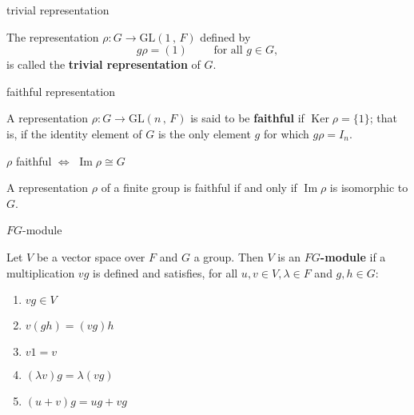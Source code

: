 \documentclass[avery5371,grid]{flashcards}
\newcommand{\iso}{\cong}
\newcommand{\GLnF}[2]{\ensuremath{\textrm{GL} \left( #1 \, , \, #2 \right)}}
\DeclareMathOperator{\Ker}{\ensuremath{\textrm{Ker}}}
\DeclareMathOperator{\Img}{\ensuremath{\textrm{Im}}}
\newcommand{\defn}[1]{\textbf{#1}}
\begin{document}
\begin{flashcard}[Definition 3.5]{trivial representation}

  The representation $\rho: G \to \GLnF{1}{F}$ defined by
  \[
    g \rho = (1)\qquad \text{ for all } g \in G,
  \]
  is called the \defn{trivial representation} of $G$.

\end{flashcard}

\begin{flashcard}[Definition3.6]{faithful representation}

  A representation $\rho : G \to \GLnF{n}{F}$ is said to be
  \defn{faithful} if $\Ker{\rho} = \{ 1 \}$; that is, if the identity
  element of $G$ is the only element $g$ for which $g\rho = I_n$.

\end{flashcard}

\begin{flashcard}[Proposition 3.7]{$\rho$ faithful $\Leftrightarrow$
    $\Img \rho \iso G$ }

  A representation $\rho$ of a finite group is faithful if and only if
  $\Img \rho$ is isomorphic to $G$.

\end{flashcard}

\begin{flashcard}[Definition 4.2]{$FG$-module}

  Let $V$ be a vector space over $F$ and $G$ a group. Then $V$ is an
  \defn{$FG$-module} if a multiplication $vg$ is defined and satisfies,
  for all $u,v \in V, \lambda \in F$ and $g, h \in G$:
  \begin{enumerate}
  \item $vg \in V$
  \item $v(gh) = (vg)h$
  \item $v1 = v$
  \item $(\lambda v)g = \lambda(vg)$
  \item $(u+v)g = ug + vg$
  \end{enumerate}

\end{flashcard}
\end{document}
